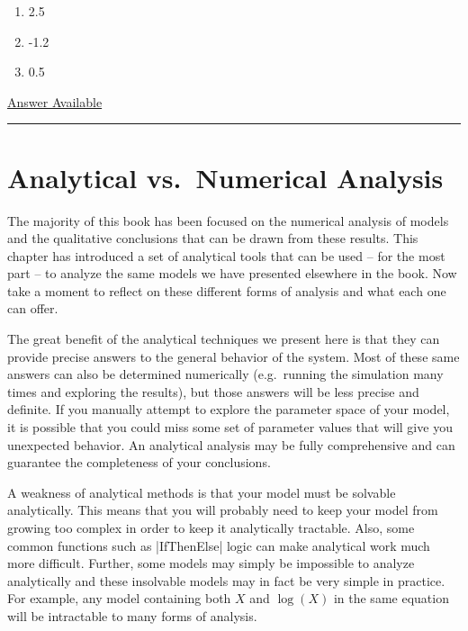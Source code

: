 \documentclass[]{memoir}
\newcommand{\NormalTok}[1]{{#1}}
\begin{document}
\begin{enumerate}
\def\labelenumi{\arabic{enumi}.}
\itemsep1pt\parskip0pt
\item
  2.5
\item
  -1.2
\item
  0.5
\end{enumerate}

\hyperref[Ans-11-18]{Answer Available}

\begin{center}\rule{3in}{0.4pt}\end{center}

\section{Analytical vs.~Numerical Analysis}

The majority of this book has been focused on the numerical analysis of
models and the qualitative conclusions that can be drawn from these
results. This chapter has introduced a set of analytical tools that can
be used -- for the most part -- to analyze the same models we have
presented elsewhere in the book. Now take a moment to reflect on these
different forms of analysis and what each one can offer.

The great benefit of the analytical techniques we present here is that
they can provide precise answers to the general behavior of the system.
Most of these same answers can also be determined numerically
(e.g.~running the simulation many times and exploring the results), but
those answers will be less precise and definite. If you manually attempt
to explore the parameter space of your model, it is possible that you
could miss some set of parameter values that will give you unexpected
behavior. An analytical analysis may be fully comprehensive and can
guarantee the completeness of your conclusions.

A weakness of analytical methods is that your model must be solvable
analytically. This means that you will probably need to keep your model
from growing too complex in order to keep it analytically tractable.
Also, some common functions such as |\NormalTok{IfThenElse}| logic can
make analytical work much more difficult. Further, some models may
simply be impossible to analyze analytically and these insolvable models
may in fact be very simple in practice. For example, any model
containing both $X$ and $\log(X)$ in the same equation will be
intractable to many forms of analysis.
\end{document}
